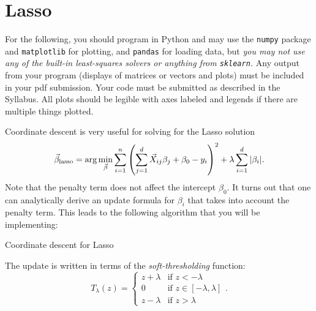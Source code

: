 \documentclass{article}
\begin{document}
\section*{Lasso}

For the following, you should program in Python and may use the
{\tt numpy} package and {\tt matplotlib} for plotting, and {\tt pandas} for loading data,
but {\em you may not use any of the built-in least-squares solvers or anything from 
{\tt sklearn}.}
Any output from your program (displays of matrices or vectors and plots) 
must be included in your pdf submission.
Your code must be submitted as described in the Syllabus.
All plots should be legible with axes labeled and legends if there are multiple things plotted.

\vspace{1em}
Coordinate descent is very useful for solving for the Lasso solution
\begin{equation*}
  \vec \beta_{\rm lasso} 
  = \arg \min_{\vec \beta} \sum_{i=1}^n \left(
    \sum_{j=1}^d \vec X_{ij} \beta_j + \beta_0 - y_i \right)^2 
  + \lambda \sum_{i=1}^d | \beta_i |.
\end{equation*}
Note that the penalty term does not affect the intercept $\beta_0$.
It turns out that one can analytically derive an update formula
for $\beta_i$ that takes into account the penalty term.
This leads to the following algorithm that you will be implementing:
\begin{algorithm}[h]
  \caption{Coordinate descent for Lasso}
  \label{alg:lasso}
\end{algorithm}

The update is written in terms of the {\em soft-thresholding} function:
\begin{equation*}
T_\lambda(z) = \begin{cases}
          z + \lambda & \mbox{if } z < -\lambda \\
          0 & \mbox{if } z \in [-\lambda, \lambda] \\
          z - \lambda & \mbox{if } z > \lambda
        \end{cases}.
\end{equation*}
\end{document}
